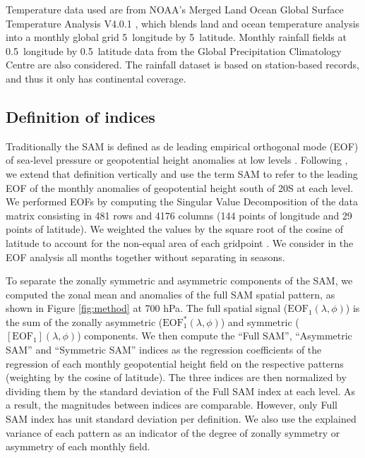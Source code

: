 \documentclass[smallextended]{svjour3}       %
\begin{document}
Temperature data used are from NOAA's Merged Land Ocean Global Surface Temperature Analysis V4.0.1 \citep{smith2008, vose2012}, which blends land and ocean temperature analysis into a monthly global grid 5\degree~longitude by 5\degree~latitude. Monthly rainfall fields at 0.5\degree~longitude by 0.5\degree~latitude data from the Global Precipitation Climatology Centre \citep{schneider2015, schneider2017} are also considered. The rainfall dataset is based on station-based records, and thus it only has continental coverage.

\hypertarget{definition-of-indices}{%
\subsection{Definition of indices}\label{definition-of-indices}}

Traditionally the SAM is defined as de leading empirical orthogonal mode (EOF) of sea-level pressure or geopotential height anomalies at low levels \citep{ho2012}. Following \citet{baldwin2001}, we extend that definition vertically and use the term SAM to refer to the leading EOF of the monthly anomalies of geopotential height south of 20\degree S at each level. We performed EOFs by computing the Singular Value Decomposition of the data matrix consisting in 481 rows and 4176 columns (144 points of longitude and 29 points of latitude). We weighted the values by the square root of the cosine of latitude to account for the non-equal area of each gridpoint \citep{chung1999}. We consider in the EOF analysis all months together without separating in seasons.

To separate the zonally symmetric and asymmetric components of the SAM, we computed the zonal mean and anomalies of the full SAM spatial pattern, as shown in Figure \ref{fig:method} at 700 hPa. The full spatial signal (\(\mathrm{EOF_1}(\lambda, \phi)\)) is the sum of the zonally asymmetric (\(\mathrm{EOF_1^*}(\lambda, \phi)\)) and symmetric (\([\mathrm{EOF_1}](\lambda, \phi)\)) components. We then compute the ``Full SAM'', ``Asymmetric SAM'' and ``Symmetric SAM'' indices as the regression coefficients of the regression of each monthly geopotential height field on the respective patterns (weighting by the cosine of latitude). The three indices are then normalized by dividing them by the standard deviation of the Full SAM index at each level. As a result, the magnitudes between indices are comparable. However, only Full SAM index has unit standard deviation per definition. We also use the explained variance of each pattern as an indicator of the degree of zonally symmetry or asymmetry of each monthly field.
\end{document}
